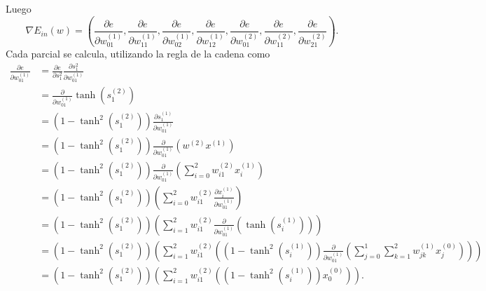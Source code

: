 Luego 
\begin{equation}
    \nabla E_{in}(w) = 
    \left(
        \frac{\partial e}{\partial w^{(1)}_{01}},
        \frac{\partial e}{\partial w^{(1)}_{11}},
        \frac{\partial e}{\partial w^{(1)}_{02}},
        \frac{\partial e}{\partial w^{(1)}_{12}},
        \frac{\partial e}{\partial w^{(2)}_{01}},
        \frac{\partial e}{\partial w^{(2)}_{11}},
        \frac{\partial e}{\partial w^{(2)}_{21}}
    \right).
\end{equation} 
Cada parcial se calcula, utilizando la regla de la cadena como
\begin{align}
    \frac{\partial e}{\partial w^{(1)}_{01}} 
    &=
    \frac{\partial e}{\partial s_1^{2}}
    \frac{\partial s_1^{2}}{\partial w^{(1)}_{01}} 
    \\
    &= 
    \frac{\partial }{\partial w^{(1)}_{01}}
         \tanh \left(s^{(2)}_{1}\right)
    \\
    &= 
    \left(1- \tanh^2 \left(s^{(2)}_{1}\right)\right) 
    \frac{\partial s^{(1)}_{1}}{\partial w^{(1)}_{01}}
    \\
    &= 
    \left(1- \tanh^2 \left(s^{(2)}_{1}\right)\right) 
    \frac{\partial }{\partial w^{(1)}_{01}}
    \left(w^{(2)}x^{(1)}\right)
    \\
    &= 
    \left(1- \tanh^2 \left(s^{(2)}_{1}\right)\right) 
    \frac{\partial }{\partial w^{(1)}_{01}}
    \left(
        \sum^2_{i=0}
        w^{(2)}_{i1}x^{(1)}_i
    \right)
    \\
    &= 
    \left(1- \tanh^2 \left(s^{(2)}_{1}\right)\right) 
    \left(
        \sum^2_{i=0}
        w^{(2)}_{i1}\frac{\partial x^{(1)}_i }{\partial w^{(1)}_{01}}
    \right)
    \\
    &= 
    \left(1- \tanh^2 \left(s^{(2)}_{1}\right)\right) 
    \left(
        \sum^2_{i=1}
        w^{(2)}_{i1}\frac{\partial }{\partial w^{(1)}_{01}}
        \left(
            \tanh \left(s^{(1)}_{i}\right)
        \right)
    \right)
    \\
    &= 
    \left(1- \tanh^2 \left(s^{(2)}_{1}\right)\right) 
    \left(
        \sum^2_{i=1}
        w^{(2)}_{i1}
        \left(
            \left(1- \tanh^2 \left(s^{(1)}_{i}\right)\right)
            \frac{\partial  }{\partial w^{(1)}_{01}}
            \left(
                \sum^1_{j=0}\sum^2_{k=1}
                w^{(1)}_{j k}x^{(0)}_j
            \right)
        \right)
    \right)
    \\
    &= 
    \left(1- \tanh^2 \left(s^{(2)}_{1}\right)\right) 
    \left(
        \sum^2_{i=1}
        w^{(2)}_{i1}
        \left(
            \left(1- \tanh^2 \left(s^{(1)}_{i}\right)\right)
            x^{(0)}_0
        \right)
    \right).
\end{align}
